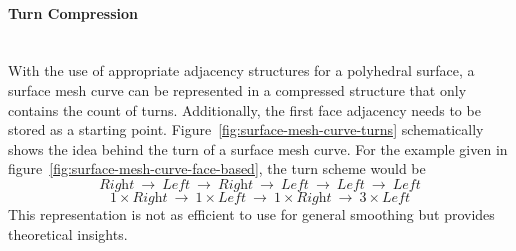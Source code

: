 \documentclass{stdlocal}
\begin{document}
  \paragraph{Turn Compression}\hfill\\
  With the use of appropriate adjacency structures for a polyhedral surface, a surface mesh curve can be represented in a compressed structure that only contains the count of turns.
  Additionally, the first face adjacency needs to be stored as a starting point.
  Figure~\ref{fig:surface-mesh-curve-turns} schematically shows the idea behind the turn of a surface mesh curve.
  For the example given in figure~\ref{fig:surface-mesh-curve-face-based}, the turn scheme would be
  \[
    \textit{Right}
    \ \longrightarrow\
    \textit{Left}
    \ \longrightarrow\
    \textit{Right}
    \ \longrightarrow\
    \textit{Left}
    \ \longrightarrow\
    \textit{Left}
    \ \longrightarrow\
    \textit{Left}
  \]
  \[
    1\times\textit{Right}
    \ \longrightarrow\
    1\times\textit{Left}
    \ \longrightarrow\
    1\times\textit{Right}
    \ \longrightarrow\
    3\times\textit{Left}
  \]
  This representation is not as efficient to use for general smoothing but provides theoretical insights.
\end{document}
